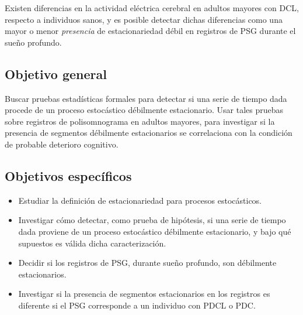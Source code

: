 Existen diferencias en la actividad eléctrica cerebral en adultos mayores con DCL, respecto a 
individuos sanos, y es posible detectar dichas diferencias como una mayor o menor 
\textit{presencia} de estacionariedad débil en registros de PSG durante el sueño profundo.


\subsection{Objetivo general}

Buscar pruebas estadísticas formales para detectar si una serie de tiempo dada procede de un 
proceso estocástico débilmente estacionario.
%
Usar tales pruebas sobre registros de polisomnograma en adultos mayores, para investigar si la 
presencia de segmentos débilmente estacionarios se correlaciona con la condición de probable
deterioro cognitivo.


\subsection{Objetivos específicos}

\begin{itemize}
\item Estudiar la definición de estacionariedad para procesos estocásticos.

\item Investigar cómo detectar, como prueba de hipótesis, si una serie de tiempo dada proviene
de un proceso estocástico débilmente estacionario, y bajo qué supuestos 
es válida dicha caracterización.

\item Decidir si los registros de PSG, durante sueño profundo, son débilmente estacionarios.

\item Investigar si la presencia de segmentos estacionarios en los registros es diferente si el
PSG corresponde a un individuo con PDCL o PDC.
\end{itemize}


